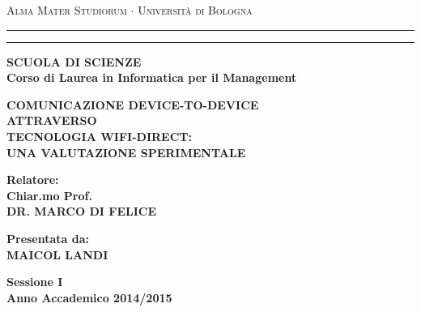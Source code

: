 \documentclass[12pt,a4paper]{report}
\begin{document}
\begin{titlepage}
\begin{center}
{{\Large{\textsc{Alma Mater Studiorum $\cdot$ Universit\`a di
Bologna}}}} \rule[0.1cm]{15.8cm}{0.1mm}
\rule[0.5cm]{15.8cm}{0.6mm}
{\small{\bf SCUOLA DI SCIENZE\\
Corso di Laurea in Informatica per il Management }}
\end{center}
\vspace{15mm}
\begin{center}
{\LARGE{\bf COMUNICAZIONE DEVICE-TO-DEVICE}}\\
\vspace{3mm}
{\LARGE{\bf ATTRAVERSO}}\\
\vspace{3mm}
{\LARGE{\bf TECNOLOGIA WIFI-DIRECT:}}\\
\vspace{3mm}
{\LARGE{\bf UNA VALUTAZIONE SPERIMENTALE}}\\
\vspace{3mm}
\end{center}
\vspace{40mm}
\par
\noindent
\begin{minipage}[t]{0.47\textwidth}
{\large{\bf Relatore:\\
Chiar.mo Prof.\\
DR. MARCO DI FELICE}}
\end{minipage}
\hfill
\begin{minipage}[t]{0.47\textwidth}\raggedleft
{\large{\bf Presentata da:\\
MAICOL LANDI}}
\end{minipage}
\vspace{20mm}
\begin{center}
{\large{\bf Sessione I\\Anno Accademico 2014/2015 }}
\end{center}
\end{titlepage}
\newpage
\thispagestyle{empty}
\mbox{}
\end{document}

